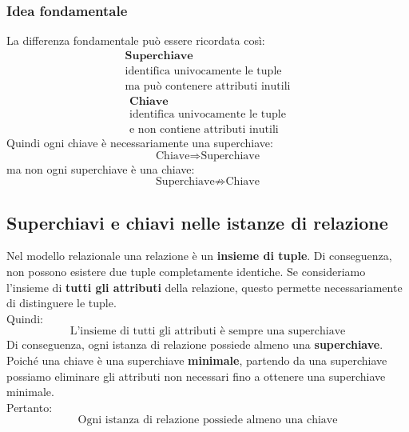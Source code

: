 \subsubsection{Idea fondamentale}
La differenza fondamentale può essere ricordata così:
\[
\boxed{
\begin{array}{c}
\textbf{Superchiave} \\[2mm]
\text{identifica univocamente le tuple} \\
\text{ma può contenere attributi inutili}
\end{array}
}
\]
\[
\boxed{
\begin{array}{c}
\textbf{Chiave} \\[2mm]
\text{identifica univocamente le tuple} \\
\text{e non contiene attributi inutili}
\end{array}
}
\]
Quindi ogni chiave è necessariamente una superchiave:
\[
\boxed{\text{Chiave} \Longrightarrow \text{Superchiave}}
\]
ma non ogni superchiave è una chiave:
\[
\boxed{\text{Superchiave} \not\Longrightarrow \text{Chiave}}
\]

\subsection{Superchiavi e chiavi nelle istanze di relazione}
Nel modello relazionale una relazione è un \textbf{insieme di tuple}.
Di conseguenza, non possono esistere due tuple completamente identiche.
Se consideriamo l'insieme di \textbf{tutti gli attributi} della relazione,
questo permette necessariamente di distinguere le tuple.\\
Quindi:
\[
\boxed{
\text{L'insieme di tutti gli attributi è sempre una superchiave}
}
\]
Di conseguenza, ogni istanza di relazione possiede almeno una
\textbf{superchiave}.
Poiché una chiave è una superchiave \textbf{minimale}, partendo da una
superchiave possiamo eliminare gli attributi non necessari fino a ottenere
una superchiave minimale.\\
Pertanto:
\[
\boxed{
\text{Ogni istanza di relazione possiede almeno una chiave}
}
\]


